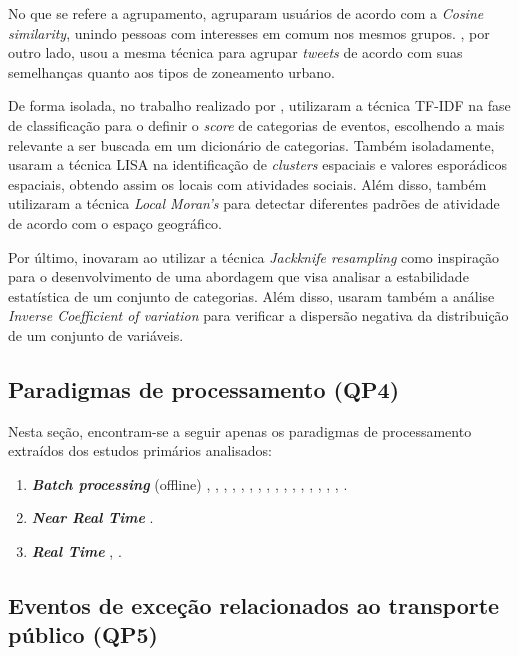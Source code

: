 \documentclass[
	12pt,				%
	oneside,			%
	a4paper,			%
	english,			%
	brazil				%
	]{abntex2ppgsi}
\begin{document}
{{No que se refere a agrupamento, \cite{Yousaf2014} agruparam usuários de acordo com a \textit{Cosine similarity}, unindo pessoas com interesses em comum nos mesmos grupos. \cite{Frias-Martinez2014}, por outro lado, usou a mesma técnica para agrupar \textit{tweets} de acordo com suas semelhanças quanto aos tipos de zoneamento urbano.

De forma isolada, no trabalho realizado por \cite{Mukherjee2015}, utilizaram a técnica TF-IDF na fase de classificação para o definir o \textit{score} de categorias de eventos, escolhendo a mais relevante a ser buscada em um dicionário de categorias. Também isoladamente, \cite{Steiger2015Census} usaram a técnica LISA na identificação de \textit{clusters} espaciais e valores esporádicos espaciais, obtendo assim os locais com atividades sociais. Além disso, também utilizaram a técnica \textit{Local Moran's} para detectar diferentes padrões de atividade de acordo com o espaço geográfico.

Por último, \cite{Bendler2014} inovaram ao utilizar a técnica \textit{Jackknife resampling} como inspiração para o desenvolvimento de uma abordagem que visa analisar a estabilidade estatística de um conjunto de categorias. Além disso, usaram também a análise \textit{Inverse Coefficient of variation} para verificar a dispersão negativa da distribuição de um conjunto de variáveis. 

\subsection{Paradigmas de processamento (QP4)}
Nesta seção, encontram-se a seguir apenas os paradigmas de processamento extraídos dos estudos primários analisados: 
\begin{enumerate}
\item \textit{\textbf{Batch processing}} (offline) \cite{Anantharam2015}, \cite{Wen2016}, \cite{Farseev2015}, \cite{Gutev2016}, \cite{Mata2015}, \cite{Chen2016}, \cite{Abbasi2015}, \cite{Bendler2014}, \cite{Bendler2014}, \cite{Yousaf2014}, \cite{Frias-Martinez2014}, \cite{Steiger2015Census}, \cite{Gal-Tzur2014}, \cite{Gkiotsalitis2016}, \cite{DiLorenzo2013}, \cite{Itoh2016}, \cite{Chaniotakis2015}.
\item \textit{\textbf{Near Real Time}} \cite{Mukherjee2015}.
\item \textit{\textbf{Real Time}} \cite{Soomro2016}, \cite{Lecue2014}.
\end{enumerate}

\subsection{Eventos de exceção relacionados ao transporte público (QP5)}
\label{qp5}

}}
\end{document}
